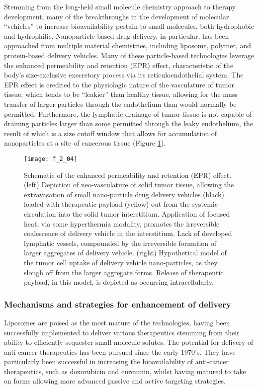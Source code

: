 \begin{refsection}
Stemming from the long-held small molecule chemistry approach to therapy development,
many of the breakthroughs in the development of molecular ``vehicles'' to
increase bioavailability pertain to small molecules, both hydrophobic and
hydrophilic. Nanoparticle-based drug delivery, in particular, has been
approached from multiple material chemistries, including liposome, polymer, and
protein-based delivery vehicles. Many of these particle-based technologies
leverage the enhanced permeability and retention (EPR) effect, characteristic of
the body's size-exclusive execretory process via its reticuloendothelial
system.\cite{Matsumura1986,Fang2010} The EPR effect is credited to the
physiologic nature of the vasculature of tumor tissue, which tends to be
``leakier'' than healthy tissue, allowing for the mass transfer of larger
particles through the endothelium than would normally be permitted. Furthermore,
the lymphatic drainage of tumor tissue is not capable of draining particles
larger than some permitted through the leaky endothelium, the result of which
is a size cutoff window that allows for accumulation of nanoparticles at a site
of cancerous tissue (Figure \ref{fig:EPR_effect}).
\begin{figure}[h!] \centering \texttt{[image: f\_2\_04]}
    \caption{Schematic of the enhanced permeability and retention (EPR) effect. (left)
Depiction of neo-vasculature of solid tumor tissue, allowing the extravasation
of small nano-particle drug delivery vehicles (black) loaded with therapeutic
payload (yellow) out from the systemic circulation into the solid tumor
interstitium. Application of focused heat, via some hyperthermia modality,
promotes the irreversible coalescence of delivery vehicle in the interstitium.
Lack of developed lymphatic vessels, compounded by the irreversible formation of
larger aggregates of delivery vehicle. (right) Hypothetical model of the tumor
cell uptake of delivery vehicle nano-particles, as they slough off from the
larger aggregate forms. Release of therapeutic payload, in this model, is
depicted as occurring intracellularly.}\label{fig:EPR_effect} \end{figure}

\subsubsection{Mechanisms and strategies for enhancement of delivery}
Liposomes are poised as the most mature of the technologies, having been
successfully implemented to deliver various therapeutics stemming from their
ability to efficiently sequester small molecule
solutes.\cite{Ranson1996,Sessa1968,Bangham1965,Bangham1974} The potential for
delivery of anti-cancer therapeutics has been pursued since the early
1970's.\cite{Gregoriadis1974} They have particularly been successful in
increasing the bioavailability of anti-cancer therapeutics, such as doxorubicin
and curcumin, whilst having matured to take on forms allowing more advanced
passive and active targeting strategies.\cite{Al-Jamal2012,Huang1994,Li2007}


\end{refsection}
